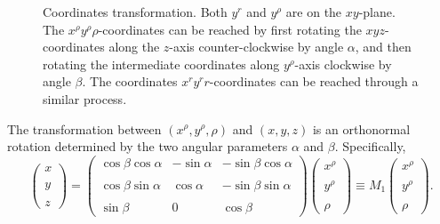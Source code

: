 \documentclass[12pt]{report}
\begin{document}
\begin{figure}[h]
  \centering
  \caption{Coordinates transformation. Both $y^r$ and $y^\rho$ are on
    the $xy$-plane. The $x^\rho y^\rho\rho$-coordinates can be reached
  by first rotating the $xyz$-coordinates along the $z$-axis
  counter-clockwise by angle $\alpha$, and then rotating the
  intermediate coordinates along $y^\rho$-axis clockwise by angle
  $\beta$. The coordinates $x^ry^rr$-coordinates can be reached
  through a similar process. }
\end{figure}
The transformation between $(x^\rho, y^\rho, \rho)$ and $(x, y, z)$ is
an orthonormal rotation determined by the two angular parameters
$\alpha$ and $\beta$. Specifically, 
\begin{equation}
  \label{eq:21}
  \left(\begin{matrix} x\\ \\ y\\ \\ z\end{matrix}\right) = 
  \left(\begin{matrix}\cos\beta\cos\alpha & -\sin\alpha &
      -\sin\beta\cos\alpha \\ \\
  \cos\beta\sin\alpha & \cos\alpha & -\sin\beta\sin\alpha \\ \\
  \sin\beta & 0 & \cos\beta\end{matrix}\right) 
  \left(\begin{matrix}x^\rho \\ \\ y^\rho \\ \\
      \rho\end{matrix}\right) \equiv M_1  \left(\begin{matrix}x^\rho
      \\ \\ y^\rho \\ \\ \rho\end{matrix}\right) . 
\end{equation}
\end{document}
